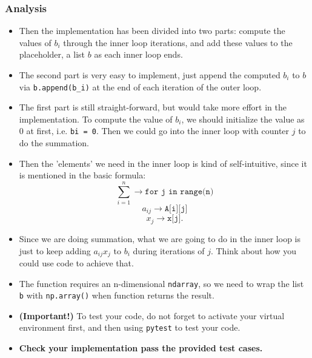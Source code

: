 \subsubsection*{Analysis}
    \begin{itemize}
    \item Then the implementation has been divided into two parts: compute the values of $b_i$ through the inner loop iterations, and add these values to the placeholder, a list $b$ as each inner loop ends.
    \item The second part is very easy to implement, just append the computed $b_i$ to $b$ via \texttt{b.append(b\_i)} at the end of each iteration of the outer loop.
    \item The first part is still straight-forward, but would take more effort in the implementation. To compute the value of $b_i$, we should initialize the value as 0 at first, i.e. \texttt{bi = 0}. Then we could go into the inner loop with counter $j$ to do the summation. 
    \item Then the 'elements' we need in the inner loop is kind of self-intuitive, since it is mentioned in the basic formula:
      \[
        \sum_{i = 1}^{n} \to \texttt{for j in range(n)}
      \] 
       \[
         a_{ij} \to  \texttt{A[i][j]}
      \] 
      \[
        x_j \to  \texttt{x[j]}
      .\]     
    \item Since we are doing summation, what we are going to do in the inner loop is just to keep adding \(a_{ij}x_j\) to \(b_i\)  during iterations of $j$. Think about how you could use code to achieve that.
    \item The function requires an n-dimensional \texttt{ndarray}, so we need to wrap the list \texttt{b} with \texttt{np.array()} when function returns the result.
    \item \textbf{(Important!)} To test your code, do not forget to activate your virtual environment first, and then using \texttt{pytest} to test your code.
    \item \textbf{Check your implementation pass the provided test cases.}
  \end{itemize}
%       
